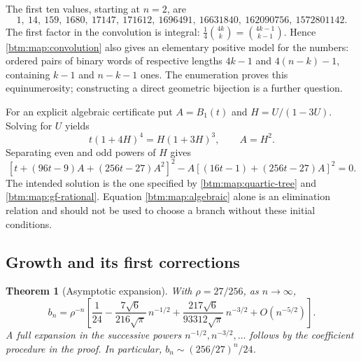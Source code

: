 \documentclass[11pt,letterpaper]{article}
\numberwithin{equation}{section}
\newtheorem{theorem}{Theorem}[section]
\theoremstyle{definition}
\theoremstyle{remark}
\begin{document}
The first ten values, starting at $n=2$, are
\[
 1,\ 14,\ 159,\ 1680,\ 17147,\ 171612,\ 1696491,\
 16631840,\ 162090756,\ 1572801142.
\]
The first factor in the convolution is integral:
$\frac14\binom{4k}{k}=\binom{4k-1}{k-1}$.
Hence \eqref{btm:map:convolution} also gives an elementary positive model for
the numbers: ordered pairs of binary words of respective lengths
$4k-1$ and $4(n-k)-1$, containing $k-1$ and $n-k-1$ ones.
The enumeration proves this equinumerosity; constructing a direct
geometric bijection is a further question.

For an explicit algebraic certificate put $A=B_1(t)$ and
$H=U/(1-3U)$.  Solving for $U$ yields
\[
 t(1+4H)^4=H(1+3H)^3,\qquad A=H^2.
\]
Separating even and odd powers of $H$ gives
\begin{equation}
 \label{btm:map:algebraic}
 \left[t+(96t-9)A+(256t-27)A^2\right]^2
 -A\left[(16t-1)+(256t-27)A\right]^2=0.
\end{equation}
The intended solution is the one specified by \eqref{btm:map:quartic-tree}
and \eqref{btm:map:gf-rational}.  Equation \eqref{btm:map:algebraic} alone is an
elimination relation and should not be used to choose a branch without
these initial conditions.

\subsection{Growth and its first corrections}
\label{btm:map:asymptotics}

\begin{theorem}[Asymptotic expansion]
 \label{btm:map:asymptotic-theorem}
 With $\rho=27/256$, as $n\to\infty$,
 \begin{equation}
  \label{btm:map:asymptotic}
  b_n=\rho^{-n}\left[
    \frac1{24}
    -\frac{7\sqrt6}{216\sqrt\pi}\,n^{-1/2}
    +\frac{217\sqrt6}{93312\sqrt\pi}\,n^{-3/2}
    +O(n^{-5/2})\right].
 \end{equation}
 A full expansion in the successive powers $n^{-1/2},n^{-3/2},\ldots$
 follows by the coefficient procedure in the proof.  In particular,
 $b_n\sim (256/27)^n/24$.
\end{theorem}
\end{document}
